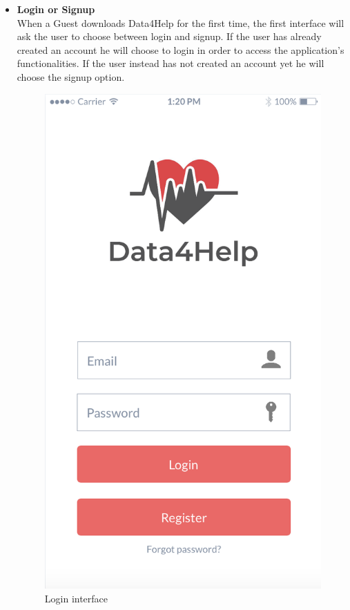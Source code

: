 \documentclass[titlepage]{article}
\begin{document}
\begin{itemize}
\begin{itemize}
				\item{\bf Login or Signup}\\
			When a Guest downloads Data4Help for the first time, the first interface will ask the user to choose between login and signup. If the user has already created an account he will choose to login in order to access the application’s functionalities. If the user instead has not created an account yet he will choose the signup option.\\
					\begin{figure}[H]
						\center
  						\includegraphics[width=0.5\columnwidth]{Mockup/mockupLogin.png}
  						\caption{Login interface}
 						 \label{fig:Login}
					\end{figure}


\end{itemize}
\end{itemize}
\end{document}
